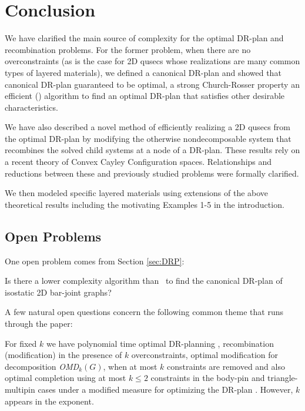 \section{Conclusion}
\label{sec:conclusion}

We have clarified the main source of complexity for the optimal DR-plan and recombination problems. For the former problem, when there are no overconstraints\cutout{,} (as is the case for 2D qusecs whose realizations are many common types of layered materials), we defined a canonical DR-plan and showed that   canonical DR-plan  guaranteed to be optimal,  a strong Church-Rosser property  an efficient (\candrpcomplexity) algorithm to find an optimal DR-plan that satisfies other desirable characteristics.

We have also described a novel method of efficiently realizing a 2D qusecs from the optimal DR-plan by modifying the otherwise nondecomposable system that recombines the solved child systems at a node of a DR-plan. These results rely on a recent theory of Convex Cayley Configuration spaces. Relationships and reductions between these and previously studied problems were formally clarified.

We then modeled specific layered materials using extensions of the above theoretical results including the motivating Examples 1-5 in the introduction.


\subsection{Open Problems}
\label{sec:appendix:b}
\label{sec:futurework}


One open problem comes from Section \ref{sec:DRP}:
\begin{openproblem}
    Is there a lower complexity algorithm than \candrpcomplexityv\ to find the canonical DR-plan of isostatic 2D bar-joint graphs?
\end{openproblem}


A few natural  open questions concern the following common theme that runs through the paper:

\begin{openproblem}
    For fixed $k$ we have polynomial time optimal DR-planning , recombination (modification) in the presence of $k$ overconstraints, optimal modification for decomposition {\sl OMD}$_k(G)$, when at most $k$ constraints are removed  and also optimal completion using at most $k\le 2$ constraints in the body-pin and triangle-multipin cases under a modified measure for optimizing the DR-plan . However,  $k$ appears in the exponent.
\end{openproblem}

